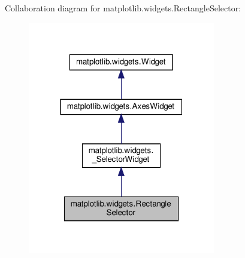 Collaboration diagram for matplotlib.\+widgets.\+Rectangle\+Selector\+:
\nopagebreak
\begin{figure}[H]
\begin{center}
\leavevmode
\includegraphics[width=232pt]{classmatplotlib_1_1widgets_1_1RectangleSelector__coll__graph}
\end{center}
\end{figure}
